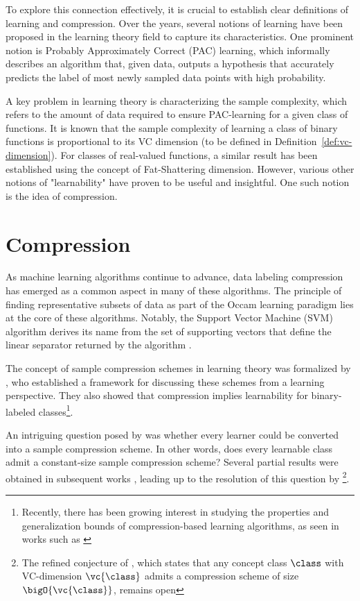 To explore this connection effectively, it is crucial to establish clear definitions of learning and compression. Over the years, several notions of learning have been proposed in the learning theory field to capture its characteristics. One prominent notion is Probably Approximately Correct (PAC) learning, which informally describes an algorithm that, given data, outputs a hypothesis that accurately predicts the label of most newly sampled data points with high probability.

A key problem in learning theory is characterizing the sample complexity, which refers to the amount of data required to ensure PAC-learning for a given class of functions. It is known that the sample complexity of learning a class of binary functions is proportional to its VC dimension (to be defined in Definition~\ref{def:vc-dimension}). For classes of real-valued functions, a similar result has been established using the concept of Fat-Shattering dimension. However, various other notions of "learnability" have proven to be useful and insightful. One such notion is the idea of compression.

\section{Compression}

As machine learning algorithms continue to advance, data labeling compression has emerged as a common aspect in many of these algorithms. The principle of finding representative subsets of data as part of the Occam learning paradigm lies at the core of these algorithms. Notably, the Support Vector Machine (SVM) algorithm derives its name from the set of supporting vectors that define the linear separator returned by the algorithm \citep{cortes1995support}.

The concept of sample compression schemes in learning theory was formalized by \citet{littlestone1986relating}, who established a framework for discussing these schemes from a learning perspective. They also showed that compression implies learnability for binary-labeled classes\footnote{Recently, there has been growing interest in studying the properties and generalization bounds of compression-based learning algorithms, as seen in works such as \citet{gkn-aistats16, DBLP:journals/ml/GraepelHS05, cummings2016adaptive}}.

An intriguing question posed by \citet{littlestone1986relating} was whether every learner could be converted into a sample compression scheme. In other words, does every learnable class admit a constant-size sample compression scheme? Several partial results were obtained in subsequent works \citep{floyd1989space,helmbold1992learning,DBLP:journals/ml/FloydW95,ben1998combinatorial,DBLP:journals/jmlr/KuzminW07,DBLP:journals/jcss/RubinsteinBR09,DBLP:journals/jmlr/RubinsteinR12,MR3047077,livni2013honest,moran2017teaching}, leading up to the resolution of this question by \citet{moran2016sample}\footnote{The refined conjecture of \citet{littlestone1986relating}, which states that any concept class $\class$ with VC-dimension $\vc{\class}$ admits a compression scheme of size $\bigO{\vc{\class}}$, remains open}.


